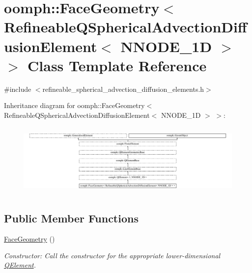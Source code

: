 \hypertarget{classoomph_1_1FaceGeometry_3_01RefineableQSphericalAdvectionDiffusionElement_3_01NNODE__1D_01_4_01_4}{}\section{oomph\+:\+:Face\+Geometry$<$ Refineable\+Q\+Spherical\+Advection\+Diffusion\+Element$<$ N\+N\+O\+D\+E\+\_\+1D $>$ $>$ Class Template Reference}
\label{classoomph_1_1FaceGeometry_3_01RefineableQSphericalAdvectionDiffusionElement_3_01NNODE__1D_01_4_01_4}


{\ttfamily \#include $<$refineable\+\_\+spherical\+\_\+advection\+\_\+diffusion\+\_\+elements.\+h$>$}

Inheritance diagram for oomph\+:\+:Face\+Geometry$<$ Refineable\+Q\+Spherical\+Advection\+Diffusion\+Element$<$ N\+N\+O\+D\+E\+\_\+1D $>$ $>$\+:\begin{figure}[H]
\begin{center}
\leavevmode
\includegraphics[height=3.649907cm]{classoomph_1_1FaceGeometry_3_01RefineableQSphericalAdvectionDiffusionElement_3_01NNODE__1D_01_4_01_4}
\end{center}
\end{figure}
\subsection*{Public Member Functions}
\begin{DoxyCompactItemize}
\item 
\hyperlink{classoomph_1_1FaceGeometry_3_01RefineableQSphericalAdvectionDiffusionElement_3_01NNODE__1D_01_4_01_4_ae09a56009d883c69047f1c1e8f0b7b8a}{Face\+Geometry} ()
\begin{DoxyCompactList}\small\item\em Constructor\+: Call the constructor for the appropriate lower-\/dimensional \hyperlink{classoomph_1_1QElement}{Q\+Element}. \end{DoxyCompactList}\end{DoxyCompactItemize}

